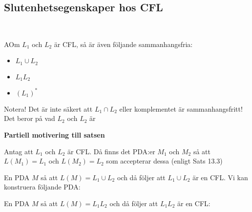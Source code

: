 \subsection{Slutenhetsegenskaper hos CFL}\hfill\\\par
\begin{theo}
  AOm $L_1$ och $L_2$ är CFL, så är även följande sammanhangsfria:\par
  \begin{itemize}
    \item $L_1\cup L_2$
    \item $L_1L_2$
    \item $(L_1)^*$
  \end{itemize}\par
  \par\bigskip
  \noindent Notera! Det är inte säkert att $L_1\cap L_2$ eller komplementet är sammanhangsfritt! Det beror på vad $L_2$ och $L_2$ är 
\end{theo}
\par\bigskip
\noindent\textbf{Partiell motivering till satsen}
\par\bigskip
\noindent Antag att $L_1$ och $L_2$ är CFL. Då finns det PDA:er $M_1$ och $M_2$ så att $L(M_1) = L_1$ och $L(M_2) = L_2$ som accepterar dessa (enligt Sats 13.3)
\par\bigskip
\noindent En PDA $M$ så att $L(M) = L_1\cup L_2$ och då följer att $L_1\cup L_2$ är en CFL. Vi kan konstruera följande PDA:
\begin{figure}[ht!]
    \centering
    \caption{}
\end{figure}
\par\bigskip
\noindent En PDA $M$ så att $L(M) = L_1L_2$ och då följer att $L_1L_2$ är en CFL:
\begin{figure}[ht!]
    \centering
    \caption{}
\end{figure}
